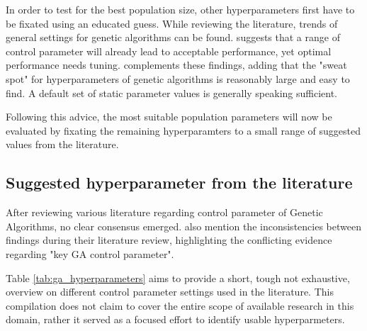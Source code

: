 In order to test for the best population size, other hyperparameters first have to be fixated using an educated guess. While reviewing the literature, trends of general settings for genetic algorithms can be found. 
\cite{grefenstette_optimization_1986} suggests that a range of control parameter will already lead to acceptable performance, yet optimal performance needs tuning. \cite{kacprzyk_parameter_2007} complements these findings, adding that the "sweat spot" for hyperparameters of genetic algorithms is reasonably large and easy to find. A default set of static parameter values is generally speaking sufficient.

Following this advice, the most suitable population parameters will now be evaluated by fixating the remaining hyperparamters to a small range of suggested values from the literature.

\subsection{Suggested hyperparameter from the literature}

After reviewing various literature regarding control parameter of Genetic Algorithms, no clear consensus emerged. \cite{mills_determining_2015} also mention the inconsistencies between findings during their literature review, highlighting the conflicting evidence regarding "key GA control parameter".

Table \ref{tab:ga_hyperparameters} aims to provide a short, tough not exhaustive, overview on different control parameter settings used in the literature. This compilation does not claim to cover the entire scope of available research in this domain, rather it served as a focused effort to identify usable hyperparmeters.

